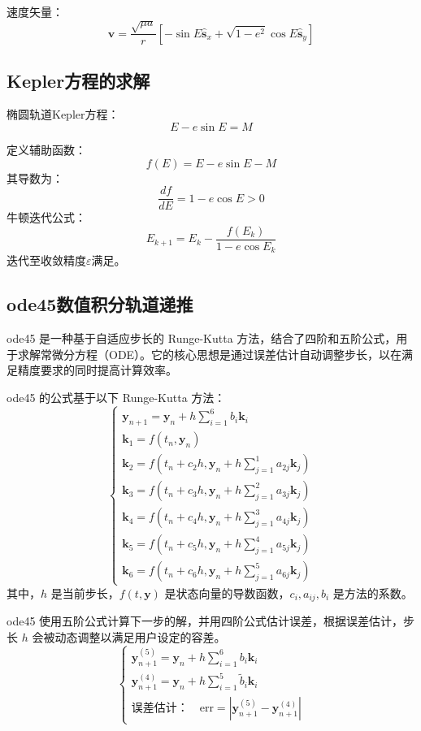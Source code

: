 \documentclass[12pt,a4paper]{article}
\begin{document}
速度矢量：
$$
\mathbf{v} = \frac{\sqrt{\mu a}}{r} \left[ -\sin E \hat{\mathbf{s}}_x + \sqrt{1 - e^2} \cos E \hat{\mathbf{s}}_y \right]
$$



\subsection{Kepler方程的求解}

椭圆轨道Kepler方程：
\begin{equation}
E - e \sin E = M
\end{equation}

定义辅助函数：
$$
f(E) = E - e \sin E - M
$$
其导数为：
$$
\frac{df}{dE} = 1 - e \cos E > 0
$$
牛顿迭代公式：
$$
E_{k+1} = E_k - \frac{f(E_k)}{1 - e \cos E_k}
$$
迭代至收敛精度$\varepsilon$满足。



\subsection{ode45数值积分轨道递推}
ode45 是一种基于自适应步长的 Runge-Kutta 方法，结合了四阶和五阶公式，用于求解常微分方程（ODE）。它的核心思想是通过误差估计自动调整步长，以在满足精度要求的同时提高计算效率。

ode45 的公式基于以下 Runge-Kutta 方法：
\[
\begin{cases}
\mathbf{y}_{n+1} = \mathbf{y}_n + h \sum_{i=1}^6 b_i \mathbf{k}_i \\
\mathbf{k}_1 = f(t_n, \mathbf{y}_n) \\
\mathbf{k}_2 = f\left(t_n + c_2 h, \mathbf{y}_n + h \sum_{j=1}^1 a_{2j} \mathbf{k}_j\right) \\
\mathbf{k}_3 = f\left(t_n + c_3 h, \mathbf{y}_n + h \sum_{j=1}^2 a_{3j} \mathbf{k}_j\right) \\
\mathbf{k}_4 = f\left(t_n + c_4 h, \mathbf{y}_n + h \sum_{j=1}^3 a_{4j} \mathbf{k}_j\right) \\
\mathbf{k}_5 = f\left(t_n + c_5 h, \mathbf{y}_n + h \sum_{j=1}^4 a_{5j} \mathbf{k}_j\right) \\
\mathbf{k}_6 = f\left(t_n + c_6 h, \mathbf{y}_n + h \sum_{j=1}^5 a_{6j} \mathbf{k}_j\right)
\end{cases}
\]
其中，\(h\) 是当前步长，\(f(t, \mathbf{y})\) 是状态向量的导数函数，\(c_i, a_{ij}, b_i\) 是方法的系数。

ode45 使用五阶公式计算下一步的解，并用四阶公式估计误差，根据误差估计，步长 \(h\) 会被动态调整以满足用户设定的容差。
\[
\begin{cases}
\mathbf{y}_{n+1}^{(5)} = \mathbf{y}_n + h \sum_{i=1}^6 b_i \mathbf{k}_i \\
\mathbf{y}_{n+1}^{(4)} = \mathbf{y}_n + h \sum_{i=1}^5 \tilde{b}_i \mathbf{k}_i \\
\text{误差估计：} \quad \text{err} = \left|\mathbf{y}_{n+1}^{(5)} - \mathbf{y}_{n+1}^{(4)}\right|
\end{cases}
\]
\end{document}
